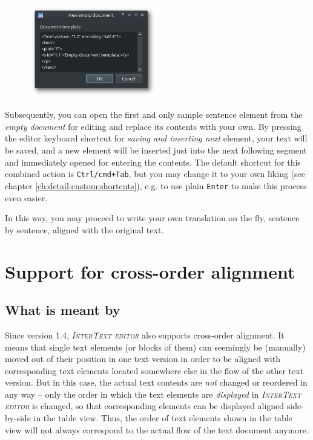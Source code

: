 \documentclass[a4paper,10pt,oneside]{book}
\newcommand{\ITeditor}{\textit{\textsc{InterText editor}}\xspace}
\newcommand{\keys}[1]{\texttt{#1}}
\begin{document}
\begin{figure}[htb]
 \includegraphics[width=0.5\textwidth]{screenshots/empty_doc_template.png}
\end{figure}

Subsequently, you can open the first and only sample sentence element from the \emph{empty document} for editing and replace its contents with your own. By pressing the editor keyboard shortcut for \emph{saving and inserting next} element, your text will be saved, and a new element will be inserted just into the next following segment and immediately opened for entering the contents. The default shortcut for this combined action is \keys{Ctrl/cmd+Tab}, but you may change it to your own liking (see chapter \ref{ch:detail:custom:shortcuts}), e.g. to use plain \keys{Enter} to make this process even easier.

In this way, you may proceed to write your own translation on the fly, sentence by sentence, aligned with the original text.

\chapter{Support for cross-order alignment}\label{ch:detail:crossorder}

\section{What is meant by }\label{ch:detail:crossorder:wtf}

Since version 1.4, \ITeditor also supports cross-order alignment. It means that single text elements (or blocks of them) can seemingly be (manually) moved out of their position in one text version in order to be aligned with corresponding text elements located somewhere else in the flow of the other text version. But in this case, the actual text contents are \emph{not} changed or reordered in any way -- only the order in which the text elements are \emph{displayed} in \ITeditor is changed, so that corresponding elements can be displayed aligned side-by-side in the table view. Thus, the order of text elements shown in the table view will not always correspond to the actual flow of the text document anymore.
\end{document}
